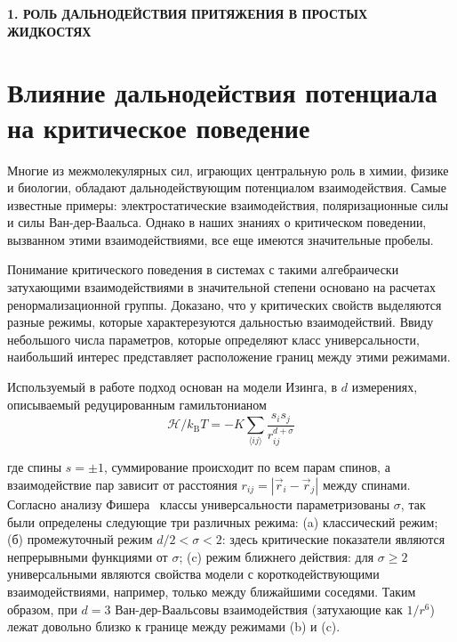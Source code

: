 \newpage
\begin{center}
	\textbf{\large 1. РОЛЬ ДАЛЬНОДЕЙСТВИЯ ПРИТЯЖЕНИЯ В ПРОСТЫХ ЖИДКОСТЯХ}
\end{center}


\section{Влияние дальнодействия потенциала на критическое поведение}

Многие из межмолекулярных сил, играющих центральную роль в химии, физике и биологии, обладают дальнодействующим потенциалом взаимодействия.
Самые известные примеры: электростатические взаимодействия, поляризационные силы и силы Ван-дер-Ваальса.
Однако в наших знаниях о критическом поведении, вызванном этими взаимодействиями, все еще имеются значительные пробелы.

Понимание критического поведения в системах с такими алгебраически затухающими взаимодействиями в значительной степени основано на расчетах ренормализационной группы.
Доказано, что у критических свойств выделяются разные режимы, которые характерезуются дальностью взаимодействий.
Ввиду небольшого числа параметров, которые определяют класс универсальности, наибольший интерес представляет расположение границ между этими режимами.


Используемый в работе подход основан на модели Изинга, в $d$ измерениях, описываемый редуцированным гамильтонианом
\begin{equation}
	\mathcal{H} / k_{\mathrm{B}} T=-K \sum_{\langle i j\rangle} \frac{s_{i} s_{j}}{r_{i j}^{d+\sigma}}
	\label{eq1}
\end{equation}

где спины $s=\pm 1$, суммирование происходит по всем парам спинов, а взаимодействие пар зависит от расстояния $r_{i j}=\left|\vec {r}_{i}-\vec{r}_{j}\right|$ между спинами. 
Согласно анализу Фишера~\cite{10.1103/PhysRevLett.29.917} классы универсальности параметризованы $\sigma$, так были определены следующие три различных режима: (a) классический режим; (б) промежуточный режим $d/2<\sigma<2$: здесь критические показатели являются непрерывными функциями от $\sigma$; (c) режим ближнего действия: для $\sigma\geq 2$ универсальными являются свойства модели с короткодействующими взаимодействиями, например, только между ближайшими соседями. 
Таким образом, при $d=3$ Ван-дер-Ваальсовы взаимодействия (затухающие как $1/r^{6}$) лежат довольно близко к границе между режимами (b) и (c).

